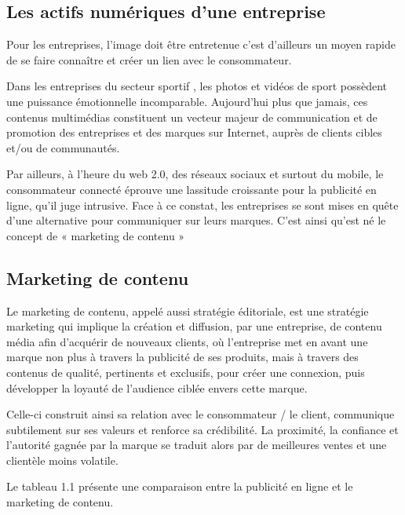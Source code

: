 \newpage
\subsection{Les actifs numériques d'une entreprise}

Pour les entreprises, l’image doit être entretenue c'est d'ailleurs un moyen rapide de se faire connaître et créer un lien avec le consommateur.
\newline

Dans les entreprises du secteur sportif , les photos et vidéos de sport possèdent une puissance émotionnelle incomparable. Aujourd’hui plus que jamais, ces contenus multimédias constituent un vecteur majeur de communication et de promotion des entreprises et des marques sur Internet, auprès de clients cibles et/ou de communautés.
\newline

Par ailleurs, à l’heure du web 2.0, des réseaux sociaux et surtout du mobile, le consommateur connecté éprouve une lassitude croissante pour la publicité en ligne, qu’il juge intrusive.
Face à ce constat, les entreprises se sont mises en quête d’une alternative pour communiquer sur leurs marques. C’est ainsi qu’est né le concept de « marketing de contenu »

\subsection{Marketing de contenu}
Le marketing de contenu, appelé aussi stratégie éditoriale, est une stratégie marketing qui implique la création et diffusion, par une entreprise, de contenu média afin d'acquérir de nouveaux clients, où l’entreprise met en avant une marque non plus à travers la publicité de ses produits, mais à travers des contenus de qualité, pertinents et exclusifs, pour créer une connexion, puis développer la loyauté de l’audience ciblée envers cette marque. 
\newline

Celle-ci construit ainsi sa relation avec le consommateur / le client, communique subtilement sur ses valeurs et renforce sa crédibilité. La proximité, la confiance et l’autorité gagnée par la marque se traduit alors par de meilleures ventes et une clientèle moins volatile.
\newline


Le tableau 1.1 présente une  comparaison entre la publicité en ligne et le marketing de contenu.
\newline
\newline
\newline


